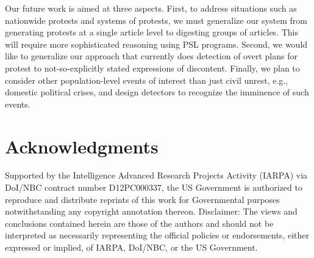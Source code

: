 \documentclass[letterpaper]{article}
\begin{document}
Our future work is aimed at three aspects. First, to address situations such as nationwide protests and systems of protests,
we must generalize our system from generating protests at a single article level to digesting groups of articles. This will
require more sophisticated reasoning using PSL programs. 
Second, we would like to generalize our approach that currently
does detection of overt plans for protest to not-so-explicitly stated expressions of discontent. 
Finally, we plan to consider other population-level events of interest than just civil unrest, e.g., domestic political crises,
and design detectors to recognize the imminence of such events.

{\small
\vspace{-0.8em}
\section*{Acknowledgments}
Supported by the Intelligence Advanced Research Projects Activity (IARPA) via
DoI/NBC contract number D12PC000337, the US Government is authorized to reproduce and distribute reprints of
this work for Governmental purposes notwithstanding any copyright annotation thereon.
Disclaimer: The views and conclusions contained herein are those of the authors and should not be interpreted as necessarily representing the official policies or endorsements, either expressed or implied, of IARPA, DoI/NBC, or the US Government.
}\vspace{-1em}
\small


\end{document}
